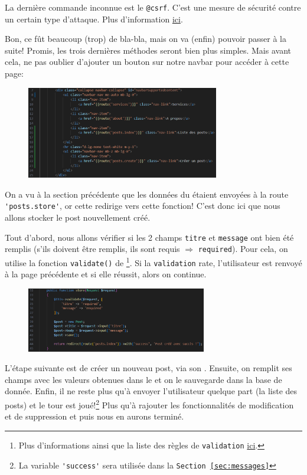 \documentclass[internal]{nhitec_design}
\begin{document}
La dernière commande inconnue est le \verb|@csrf|. C'est une mesure de sécurité contre un certain type d'attaque. Plus d'information \href{https://laravel.com/docs/10.x/csrf}{ici}.

Bon, ce fût beaucoup (trop) de bla-bla, mais on va (enfin) pouvoir passer à la suite! Promis, les trois dernières méthodes seront bien plus simples. Mais avant cela, ne pas oublier d'ajouter un bouton sur notre navbar pour accéder à cette page:

\begin{figure}[!h]
    \centering
    \includegraphics[width=0.75\textwidth]{figures-C1/post_create_navbar.pdf}
\end{figure}

\newpage

\label{sec:posts_store}

On a vu à la section précédente que les données du \form{} étaient envoyées à la route \verb|'posts.store'|, or cette \route{} redirige vers cette fonction! C'est donc ici que nous allons stocker le post nouvellement créé.

Tout d'abord, nous allons vérifier si les 2 champs \verb|titre| et \verb|message| ont bien été remplis (s'ils doivent être remplis, ils sont requis $\Rightarrow$ \verb|required|). Pour cela, on utilise la fonction \verb|validate()| de \laravel\footnote{Plus d'informations ainsi que la liste des règles de \texttt{validation} \href{https://laravel.com/docs/10.x/validation#quick-writing-the-validation-logic}{ici}.}. Si la \texttt{validation} rate, l'utilisateur est renvoyé à la page précédente et si elle réussit, alors on continue.

\begin{figure}
    \vspace{-0.5cm}
    \includegraphics[width=0.7\textwidth]{figures-C1/post_store_controller.pdf}
\end{figure}
L'étape suivante est de créer un nouveau post, via son \model{}. Ensuite, on remplit ses champs avec les valeurs obtenues dans le \form{} et on le sauvegarde dans la base de donnée. Enfin, il ne reste plus qu'à envoyer l'utilisateur quelque part (la liste des posts) et le tour est joué!\footnote{La variable \verb|'success'| sera utilisée dans la \texttt{Section~\ref{sec:messages}}} Plus qu'à rajouter les fonctionnalités de modification et de suppression et puis nous en aurons terminé.
\end{document}

